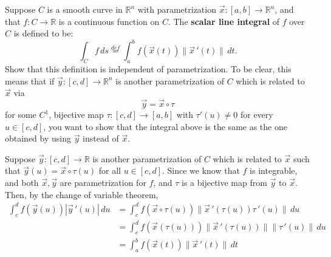 \documentclass[11pt,letterpaper,cm]{nupset}
\begin{document}
\begin{problem}[Exercise 10] Suppose $C$ is a smooth curve in $\mathbb{R}^n$ with parametrization $\vec{x}: [a,b] \to \mathbb{R}^n$, and that $f: C \to \mathbb{R}$ is a continuous function on $C$. The \textbf{scalar line integral} of $f$ over $C$ is defined to be:
	\[ \int_C f\,ds \stackrel{def}{=} \int_a^b f(\vec{x}(t))\|\vec{x}\,'(t)\|\,dt. \]
	Show that this definition is independent of parametrization. To be clear, this means that if $\vec{y}: [c,d] \to \mathbb{R}^n$ is another parametrization of $C$ which is related to $\vec{x}$ via
	\[ \vec{y} = \vec{x} \circ \tau \]
	for some $C^1$, bijective map $\tau: [c,d] \to [a,b]$ with $\tau'(u)\neq 0$ for every $u\in [c,d]$, you want to show that the integral above is the same as the one obtained by using $\vec{y}$ instead of $\vec{x}$.
\end{problem}
\begin{solution}
	Suppose $\vec{y}:[c,d]\to \mathbb{R}$ is another parametrization of $C$ which is related to $\vec{x}$ such that $\vec{y}(u)=\vec{x}\circ\tau(u)$ for all $u\in [c,d]$. Since we know that $f$ is integrable, and both $\vec{x},\vec{y}$ are parametrization for $f$, and $\tau$ is a bijective map from $\vec{y}$ to $\vec{x}$. Then, by the change of variable theorem,
	\begin{align*}
		\int_c^d f(\vec{y}(u))|\vec{y}\,'(u)|\,du&=\int_c^d f(\vec{x}\circ\tau(u))\|\vec{x}\,'(\tau(u))\tau\,'(u)\|\,du\\
		&=\int_c^d f(\vec{x}(\tau(u)))\|\vec{x}\,'(\tau(u))\|\|\tau\,'(u)\|\,du\\
		&=\int_a^b f(\vec{x}(t))\|\vec{x}\,'(t)\|\,dt
	\end{align*}
\end{solution}
\end{document}
